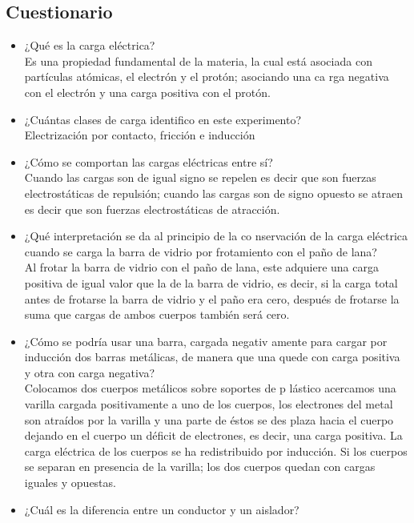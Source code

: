 \documentclass[11pt]{article}
\begin{document}
\begin{multicols}{2}
\section{Cuestionario}


\begin{itemize}

	\item ¿Qué es la carga eléctrica?\\
	Es una propiedad fundamental de la materia, la cual
 está asociada con partículas
atómicas, el electrón y el protón; asociando una ca
rga negativa con el electrón y
una carga positiva con el protón.
	\item ¿Cuántas clases de carga identifico en este experimento?\\
Electrización por contacto, fricción e inducción
	\item ¿Cómo se comportan las cargas eléctricas entre sí?\\
Cuando las cargas son de igual signo se repelen es 
decir que son fuerzas
electrostáticas de repulsión; cuando las cargas son de signo opuesto se atraen es
 decir que son fuerzas
electrostáticas de atracción.
	\item ¿Qué interpretación se da al principio de la co
nservación de la carga eléctrica
cuando se carga la barra de vidrio por frotamiento 
con el paño de lana?\\
 Al frotar la barra de vidrio con el paño de lana, 
este adquiere una carga positiva de
igual valor que la de la barra de vidrio, es decir,
 si la carga total antes de frotarse
la barra de vidrio y el paño era cero, después de frotarse la suma que cargas de
ambos cuerpos también será cero.
	\item ¿Cómo se podría usar una barra, cargada negativ
amente para cargar por
inducción dos barras metálicas, de manera que una quede con carga positiva y
otra con carga negativa?\\
Colocamos dos cuerpos metálicos sobre soportes de p
lástico acercamos una
varilla cargada positivamente a uno de los cuerpos,
 los electrones del metal son
atraídos por la varilla y una parte de éstos se des
plaza hacia el cuerpo dejando en
el cuerpo un déficit de electrones, es decir, una carga positiva. La carga eléctrica
de los cuerpos se ha redistribuido por inducción. Si los cuerpos se separan en
presencia de la varilla; los dos cuerpos quedan con
 cargas iguales y opuestas.
	\item ¿Cuál es la diferencia entre un conductor y un 
aislador?\\

\end{itemize}
\end{multicols}
\end{document}
